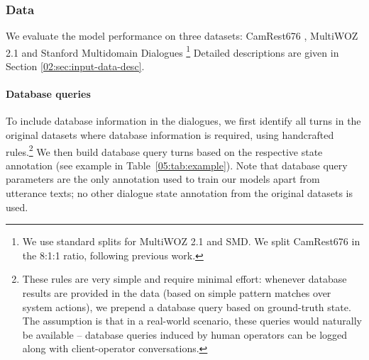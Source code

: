 \subsubsection{Data}
\label{05:sec:data}

We evaluate the model performance on three datasets: CamRest676 \cite{wen2016network}, MultiWOZ 2.1 \cite{budzianowski2018multiwoz,eric2019multiwoz} and Stanford Multidomain Dialogues \cite[SMD;][]{eric-etal-2017-key}\footnote{We use standard splits for MultiWOZ 2.1 and SMD. We split CamRest676 in the 8:1:1 ratio, following previous work.}
Detailed descriptions are given in Section \ref{02:sec:input-data-desc}.

\paragraph{Database queries} To include database information in the dialogues, we first identify all turns in the original datasets where database information is required, using handcrafted rules.\footnote{These rules are very simple and require minimal effort: whenever database results are provided in the data (based on simple pattern matches over system actions), we prepend a database query based on ground-truth state. The assumption is that in a real-world scenario, these queries would naturally be available -- database queries induced by human operators can be logged along with client-operator conversations.}
We then build database query turns based on the respective state annotation (see example in Table~\ref{05:tab:example}).
Note that database query parameters are the only annotation used to train our models apart from utterance texts; no other dialogue state annotation from the original datasets is used.
